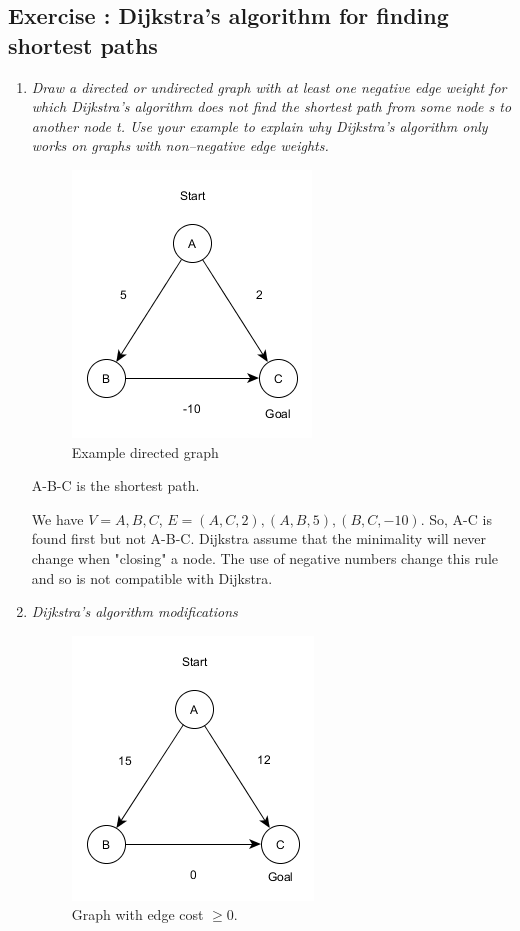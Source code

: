 \documentclass[10pt,a4paper]{article}
\newcommand{\exercise}[1]
{
  \stepcounter{subsection}
  \subsection*{Exercise \thesubsection: #1}

}
\begin{document}
\exercise{ Dijkstra’s algorithm for finding shortest paths }
\begin{enumerate}

\item \textit{Draw a directed or undirected graph with at least one negative edge weight for which Dijkstra’s
	algorithm does not find the shortest path from some node s to another node t. Use
	your example to explain why Dijkstra’s algorithm only works on graphs with non–negative
	edge weights.}\\

\begin{figure}[H]
	\centering
	\includegraphics[width=0.5\linewidth]{1a}
	\caption{Example directed graph}
	\label{fig:1a}
\end{figure}

A-B-C is the shortest path. 

We have $ V = {A, B, C} $, $E = {(A,C,2), (A,B,5), (B,C,-10)}$. So, A-C is found first but not A-B-C. 
Dijkstra assume that the minimality will never change when "closing" a node. The use of negative numbers change this rule and so is not compatible with Dijkstra. 


\item \textit{Dijkstra’s algorithm modifications}


\begin{figure}[H]
	\centering
	\includegraphics[width=0.5\linewidth]{1b}
	\caption{Graph with edge cost $\geq 0$.}
	\label{fig:1b}
\end{figure}


\end{enumerate}
\end{document}
